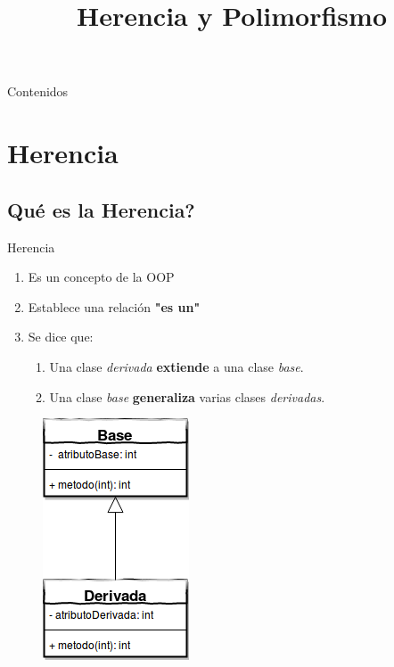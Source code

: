 


\title%
{Herencia y Polimorfismo}

\subject{Herencia y Polimorfismo}



\begin{frame}
   \titlepage
\end{frame}

\begin{frame}{Contenidos}
   \tableofcontents
\end{frame}

\section{Herencia}
\subsection{\textquestiondown Qu\'e es la Herencia?}
\begin{frame}{Herencia}{}
   \begin{enumerate}
      \item Es un concepto de la OOP
      \item Establece una relaci\'on \textbf{"es un"}
      \item Se dice que:
      \begin{enumerate}
         \item Una clase \textit{derivada} \textbf{extiende} a una clase \textit{base}.
         \item Una clase \textit{base} \textbf{generaliza} varias clases \textit{derivadas}.
      \end{enumerate}
   \end{enumerate}

   \begin{figure}
      \centering

      \includegraphics[height=0.5\textheight]{./Herencia.png}
   \end{figure}
\end{frame}

